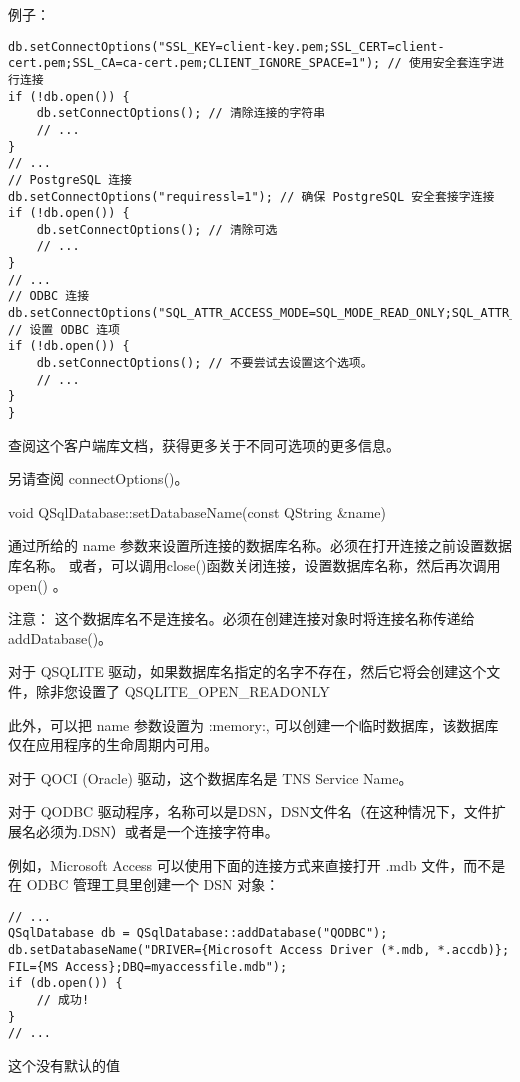 \clearpage

例子：

\begin{lstlisting}
db.setConnectOptions("SSL_KEY=client-key.pem;SSL_CERT=client-cert.pem;SSL_CA=ca-cert.pem;CLIENT_IGNORE_SPACE=1"); // 使用安全套连字进行连接
if (!db.open()) {
	db.setConnectOptions(); // 清除连接的字符串
	// ...
}
// ...
// PostgreSQL 连接
db.setConnectOptions("requiressl=1"); // 确保 PostgreSQL 安全套接字连接
if (!db.open()) {
	db.setConnectOptions(); // 清除可选
	// ...
}
// ...
// ODBC 连接
db.setConnectOptions("SQL_ATTR_ACCESS_MODE=SQL_MODE_READ_ONLY;SQL_ATTR_TRACE=SQL_OPT_TRACE_ON"); // 设置 ODBC 连项
if (!db.open()) {
	db.setConnectOptions(); // 不要尝试去设置这个选项。
	// ...
}
}
\end{lstlisting}

查阅这个客户端库文档，获得更多关于不同可选项的更多信息。

另请查阅 connectOptions()。

void QSqlDatabase::setDatabaseName(const QString \&name)

通过所给的 name 参数来设置所连接的数据库名称。必须在打开连接之前设置数据库名称。 或者，可以调用close()函数关闭连接，设置数据库名称，然后再次调用open() 。

注意： 这个数据库名不是连接名。必须在创建连接对象时将连接名称传递给 addDatabase()。

对于 QSQLITE 驱动，如果数据库名指定的名字不存在，然后它将会创建这个文件，除非您设置了 QSQLITE\_OPEN\_READONLY

此外，可以把 name 参数设置为 :memory:, 可以创建一个临时数据库，该数据库仅在应用程序的生命周期内可用。

对于 QOCI (Oracle) 驱动，这个数据库名是 TNS Service Name。

对于 QODBC 驱动程序，名称可以是DSN，DSN文件名（在这种情况下，文件扩展名必须为.DSN）或者是一个连接字符串。

例如，Microsoft Access 可以使用下面的连接方式来直接打开 .mdb 文件，而不是在 ODBC 管理工具里创建一个 DSN 对象：

\clearpage

\begin{lstlisting}
// ...
QSqlDatabase db = QSqlDatabase::addDatabase("QODBC");
db.setDatabaseName("DRIVER={Microsoft Access Driver (*.mdb, *.accdb)};
FIL={MS Access};DBQ=myaccessfile.mdb");
if (db.open()) {
	// 成功!
}
// ...
\end{lstlisting}

这个没有默认的值

